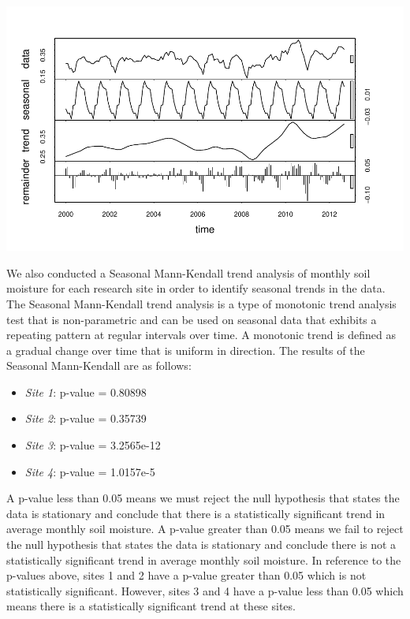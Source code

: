 \documentclass[
  12pt,
]{article}
\providecommand{\tightlist}{%
  \setlength{\itemsep}{0pt}\setlength{\parskip}{0pt}}
\begin{document}
\includegraphics{Project_Template_files/figure-latex/TSA-4.pdf}

We also conducted a Seasonal Mann-Kendall trend analysis of monthly soil
moisture for each research site in order to identify seasonal trends in
the data. The Seasonal Mann-Kendall trend analysis is a type of
monotonic trend analysis test that is non-parametric and can be used on
seasonal data that exhibits a repeating pattern at regular intervals
over time. A monotonic trend is defined as a gradual change over time
that is uniform in direction. The results of the Seasonal Mann-Kendall
are as follows:

\begin{itemize}
\tightlist
\item
  \emph{Site 1}: p-value = 0.80898
\item
  \emph{Site 2}: p-value = 0.35739
\item
  \emph{Site 3}: p-value = 3.2565e-12
\item
  \emph{Site 4}: p-value = 1.0157e-5
\end{itemize}

A p-value less than 0.05 means we must reject the null hypothesis that
states the data is stationary and conclude that there is a statistically
significant trend in average monthly soil moisture. A p-value greater
than 0.05 means we fail to reject the null hypothesis that states the
data is stationary and conclude there is not a statistically significant
trend in average monthly soil moisture. In reference to the p-values
above, sites 1 and 2 have a p-value greater than 0.05 which is not
statistically significant. However, sites 3 and 4 have a p-value less
than 0.05 which means there is a statistically significant trend at
these sites.
\end{document}
